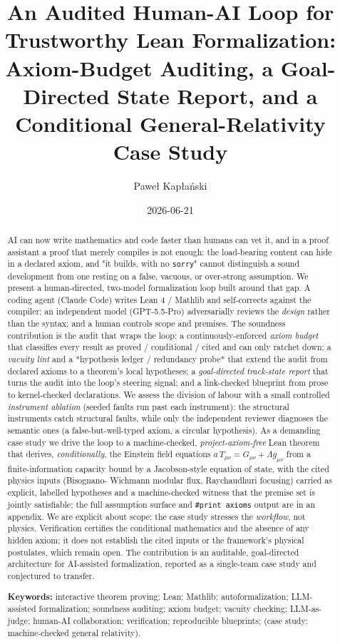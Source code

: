 \documentclass[11pt]{article}
\title{An Audited Human-AI Loop for Trustworthy Lean Formalization:\\
Axiom-Budget Auditing, a Goal-Directed State Report, and a Conditional General-Relativity Case Study}
\author{Paweł Kapłański}
\date{2026-06-21}
\begin{document}
\maketitle

\begin{abstract}
\noindent
AI can now write mathematics and code faster than humans can vet it, and in a proof assistant a
proof that merely compiles is not enough: the load-bearing content can hide in a declared axiom, and
"it builds, with no \texttt{sorry}" cannot distinguish a sound development from one resting on a false,
vacuous, or over-strong assumption. We present a human-directed, two-model formalization loop built
around that gap. A coding agent (Claude Code) writes Lean 4 / Mathlib and self-corrects against the
compiler; an independent model (GPT-5.5-Pro) adversarially reviews the \emph{design} rather than the
syntax; and a human controls scope and premises. The soundness contribution is the audit that wraps
the loop: a continuously-enforced \emph{axiom budget} that classifies every result as proved /
conditional / cited and can only ratchet down; a \emph{vacuity lint} and a *hypothesis ledger /
redundancy probe* that extend the audit from declared axioms to a theorem's local hypotheses; a
\emph{goal-directed track-state report} that turns the audit into the loop's steering signal; and a
link-checked blueprint from prose to kernel-checked declarations. We assess the division of labour
with a small controlled \emph{instrument ablation} (seeded faults run past each instrument): the
structural instruments catch structural faults, while only the independent reviewer diagnoses the
semantic ones (a false-but-well-typed axiom, a circular hypothesis). As a demanding case study we
drive the loop to a machine-checked, \emph{project-axiom-free} Lean theorem that derives, \emph{conditionally},
the Einstein field equations $a\,T_{\mu\nu}=G_{\mu\nu}+\Lambda g_{\mu\nu}$ from a finite-information
capacity bound by a Jacobson-style equation of state, with the cited physics inputs (Bisognano-
Wichmann modular flux, Raychaudhuri focusing) carried as explicit, labelled hypotheses and a
machine-checked witness that the premise set is jointly satisfiable; the full assumption surface and
\texttt{\#print axioms} output are in an appendix. We are explicit about scope: the case study stresses the
\emph{workflow}, not physics. Verification certifies the conditional mathematics and the absence of any
hidden axiom; it does not establish the cited inputs or the framework's physical postulates, which
remain open. The contribution is an auditable, goal-directed architecture for AI-assisted
formalization, reported as a single-team case study and conjectured to transfer.

\medskip
\noindent\textbf{Keywords:} interactive theorem proving; Lean; Mathlib; autoformalization; LLM-assisted
formalization; soundness auditing; axiom budget; vacuity checking; LLM-as-judge; human-AI
collaboration; verification; reproducible blueprints; (case study: machine-checked general relativity).
\end{abstract}
\end{document}
